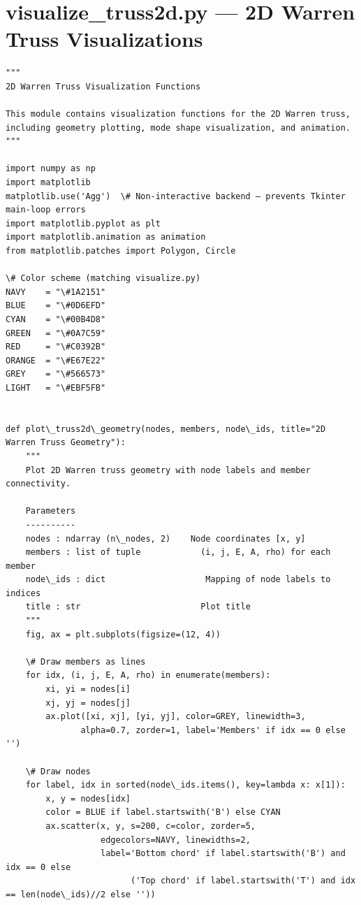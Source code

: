 \documentclass[12pt, a4paper]{article}
\begin{document}
\section{visualize_truss2d.py --- 2D Warren Truss Visualizations}
\begin{lstlisting}[style=codestyle, caption={{visualize_truss2d.py --- 2D Warren Truss Visualizations}}]
"""
2D Warren Truss Visualization Functions

This module contains visualization functions for the 2D Warren truss,
including geometry plotting, mode shape visualization, and animation.
"""

import numpy as np
import matplotlib
matplotlib.use('Agg')  \# Non-interactive backend — prevents Tkinter main-loop errors
import matplotlib.pyplot as plt
import matplotlib.animation as animation
from matplotlib.patches import Polygon, Circle

\# Color scheme (matching visualize.py)
NAVY    = "\#1A2151"
BLUE    = "\#0D6EFD"
CYAN    = "\#00B4D8"
GREEN   = "\#0A7C59"
RED     = "\#C0392B"
ORANGE  = "\#E67E22"
GREY    = "\#566573"
LIGHT   = "\#EBF5FB"


def plot\_truss2d\_geometry(nodes, members, node\_ids, title="2D Warren Truss Geometry"):
    """
    Plot 2D Warren truss geometry with node labels and member connectivity.

    Parameters
    ----------
    nodes : ndarray (n\_nodes, 2)    Node coordinates [x, y]
    members : list of tuple            (i, j, E, A, rho) for each member
    node\_ids : dict                    Mapping of node labels to indices
    title : str                        Plot title
    """
    fig, ax = plt.subplots(figsize=(12, 4))

    \# Draw members as lines
    for idx, (i, j, E, A, rho) in enumerate(members):
        xi, yi = nodes[i]
        xj, yj = nodes[j]
        ax.plot([xi, xj], [yi, yj], color=GREY, linewidth=3,
               alpha=0.7, zorder=1, label='Members' if idx == 0 else '')

    \# Draw nodes
    for label, idx in sorted(node\_ids.items(), key=lambda x: x[1]):
        x, y = nodes[idx]
        color = BLUE if label.startswith('B') else CYAN
        ax.scatter(x, y, s=200, c=color, zorder=5,
                   edgecolors=NAVY, linewidths=2,
                   label='Bottom chord' if label.startswith('B') and idx == 0 else
                         ('Top chord' if label.startswith('T') and idx == len(node\_ids)//2 else ''))


\end{lstlisting}
\end{document}
